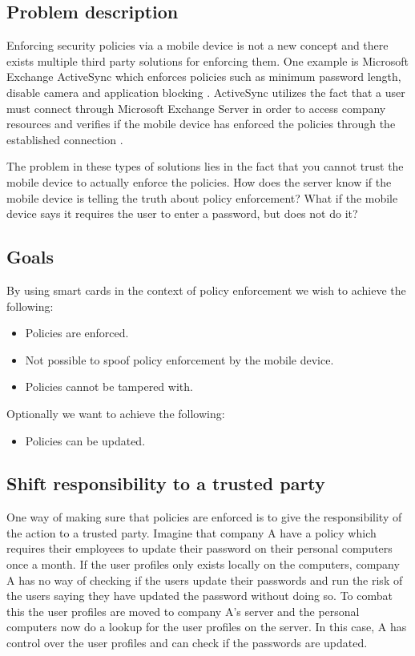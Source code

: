 \subsection{Problem description}
Enforcing security policies via a mobile device is not a new concept and there exists multiple third party solutions for enforcing them. One example is Microsoft Exchange ActiveSync which enforces policies such as minimum password length, disable camera and application blocking \cite{exchangePolicies}. ActiveSync utilizes the fact that a user must connect through Microsoft Exchange Server in order to access company resources and verifies if the mobile device has enforced the policies through the established connection \cite{exchangePoliciesTech}.

The problem in these types of solutions lies in the fact that you cannot trust the mobile device to actually enforce the policies. How does the server know if the mobile device is telling the truth about policy enforcement? What if the mobile device says it requires the user to enter a password, but does not do it?

\subsection{Goals}
By using smart cards in the context of policy enforcement we wish to achieve the following:
\begin{itemize}
  \item Policies are enforced.
  \item Not possible to spoof policy enforcement by the mobile device.
  \item Policies cannot be tampered with.
\end{itemize}
Optionally we want to achieve the following:
\begin{itemize}
  \item Policies can be updated.
\end{itemize}

\subsection{Shift responsibility to a trusted party}
One way of making sure that policies are enforced is to give the responsibility of the action to a trusted party. Imagine that company A have a policy which requires their employees to update their password on their personal computers once a month. If the user profiles only exists locally on the computers, company A has no way of checking if the users update their passwords and run the risk of the users saying they have updated the password without doing so. To combat this the user profiles are moved to company A's server and the personal computers now do a lookup for the user profiles on the server. In this case, A has control over the user profiles and can check if the passwords are updated.

